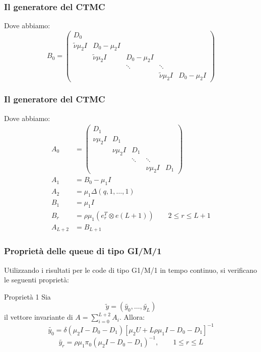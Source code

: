 \documentclass{beamer}
\begin{document}
\begin{frame}
    \frametitle{Il generatore del CTMC}
    Dove abbiamo:
    \begin{equation*}
        B_0 =
        \begin{pmatrix}
            D_0 & & & & \\
            \widetilde{\nu}\mu_2 I & D_0 - \mu_2 I & & & \\
            & \widetilde{\nu}\mu_2 I & D_0 - \mu_2 I & & \\
            & & \ddots & \ddots & \\
            & & & \widetilde{\nu}\mu_2 I & D_0 - \mu_2 I
        \end{pmatrix}
    \end{equation*}
\end{frame}


\begin{frame}
    \frametitle{Il generatore del CTMC}
    Dove abbiamo:
    \begin{equation*}
        \begin{split}
            A_0 &=
            \begin{pmatrix}
                D_1 & & & & \\
                \nu\mu_2 I & D_1 & & & \\
                & \nu \mu_2 I & D_1 & & \\
                & & \ddots & \ddots & \\
                & & & \nu \mu_2 I & D_1
            \end{pmatrix} \\
            A_1 &= B_0 -\mu_1 I \\
            A_2 & = \mu_1 \Delta(q,1, \dots, 1) \\
            B_1 &= \mu_1 I \\
            B_r &= \rho \mu_1 (e_r^T \otimes e(L+1)) \qquad 2 \leq r \leq L+1 \\
            A_{L+2} &= B_{L+1}
        \end{split}
    \end{equation*}
\end{frame}


\begin{frame}
    \frametitle{Proprietà delle queue di tipo GI/M/1}
    Utilizzando i risultati per le code di tipo G1/M/1 in tempo continuo, si verificano le seguenti proprietà:
    \begin{block}{Proprietà 1}
        Sia
        $$\widetilde{y} = (\widetilde{y_0}, \dots, \widetilde{y_{L}})$$
        il vettore invariante di $\displaystyle A = \sum_{i=0}^{L+2} A_i$. Allora:
            $$ \widetilde{y_0} = \delta(\mu_2I - D_0 - D_1)[\mu_2U + L\rho\mu_1 I - D_0 - D_1]^{-1} $$
            $$ \widetilde{y_r} = \rho \mu_1 \pi_0(\mu_2I - D_0 - D_1)^{-1}, \qquad 1 \leq r \leq L $$
    \end{block}
\end{frame}
\end{document}

